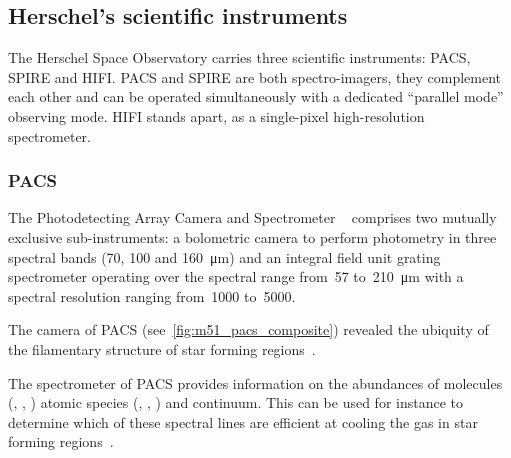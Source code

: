 
\subsection{Herschel's scientific instruments}

The Herschel Space Observatory carries three scientific instruments: PACS, SPIRE and HIFI.
PACS and SPIRE are both  spectro-imagers, they complement each other and can be operated simultaneously with a dedicated ``parallel mode'' observing mode.
HIFI stands apart, as a single-pixel high-resolution spectrometer.

\subsubsection{PACS}
The Photodetecting Array Camera and Spectrometer%
~\parencite{poglitsch2010photodetector}
comprises two mutually exclusive sub-instruments: a bolometric camera to perform photometry in three spectral bands (\num{70}, \num{100} and \SI{160}{\micro\meter}) and an integral field unit grating spectrometer operating over the spectral range from~\num{57} to~\SI{210}{\micro\meter} with a spectral resolution ranging from~\num{1000} to~\num{5000}.

The camera of PACS (see~\cref{fig:m51_pacs_composite}) revealed the ubiquity of the filamentary structure of star forming regions~\parencite{2010A&A...518L.100M}.

The spectrometer of PACS provides information on the abundances of molecules
(, , ) atomic species (, , ) and continuum.
This can be used for instance to determine which of these spectral lines are efficient at cooling the gas in star forming regions~\parencite{2013A&A...552A.141K}.

